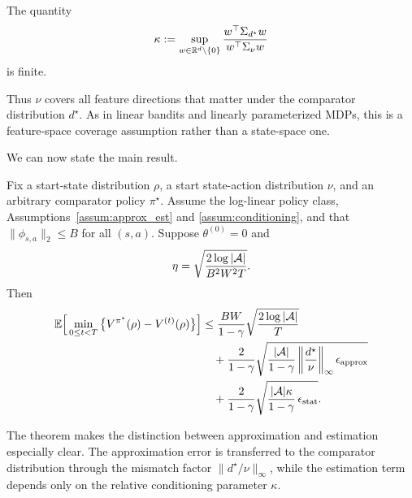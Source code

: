 \begin{assumption}
\label{assum:conditioning}
The quantity
\[
\kappa
:=
\sup_{w\in\mathbb{R}^d\setminus\{0\}}
\frac{w^\top \Sigma_{d^\star}w}{w^\top \Sigma_\nu w}
\]
is finite.
\end{assumption}

Thus $\nu$ covers all feature directions that matter under the comparator distribution
$d^\star$. As in linear bandits and linearly parameterized MDPs, this is a feature-space
coverage assumption rather than a state-space one.

We can now state the main result.

\begin{theorem}\label{thm:q_npg_fa}
Fix a start-state distribution $\rho$, a start state-action distribution $\nu$, and an
arbitrary comparator policy $\pi^\star$.
Assume the log-linear policy class, Assumptions~\ref{assum:approx_est} and
\ref{assum:conditioning}, and that $\|\phi_{s,a}\|_2\le B$ for all $(s,a)$.
Suppose $\theta^{(0)}=0$ and
\[
\eta
=
\sqrt{\frac{2\log |\mathcal{A}|}{B^2W^2T}}.
\]
Then
\begin{align*}
\mathbb{E}\Big[\min_{0\le t<T}\big\{V^{\pi^\star}(\rho)-V^{(t)}(\rho)\big\}\Big]
&\le
\frac{BW}{1-\gamma}\sqrt{\frac{2\log |\mathcal{A}|}{T}} \\
&\quad +
\frac{2}{1-\gamma}
\sqrt{\frac{|\mathcal{A}|}{1-\gamma}
\left\|\frac{d^\star}{\nu}\right\|_\infty \epsilon_{\mathrm{approx}}} \\
&\quad +
\frac{2}{1-\gamma}
\sqrt{\frac{|\mathcal{A}|\kappa}{1-\gamma}\,\epsilon_{\mathrm{stat}}}.
\end{align*}
\end{theorem}

The theorem makes the distinction between approximation and estimation especially clear.
The approximation error is transferred to the comparator distribution through the mismatch
factor $\|d^\star/\nu\|_\infty$, while the estimation term depends only on the relative
conditioning parameter $\kappa$.

